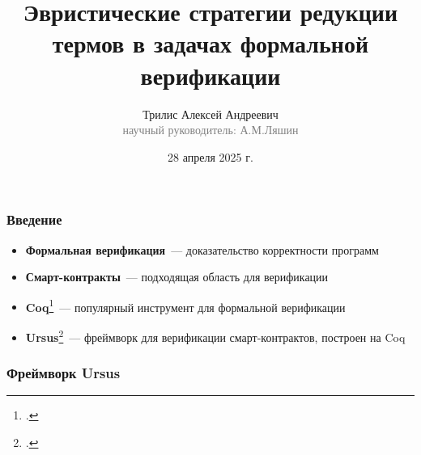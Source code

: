 \documentclass{beamer}
\begin{document}
\title[Стратегии редукции термов в верификации]{Эвристические стратегии редукции термов в задачах формальной верификации}
\author[Трилис А.А.]{Трилис Алексей Андреевич\\{\footnotesize\textcolor{gray}{научный руководитель: А.М.Ляшин}}}
\date{28 апреля 2025 г.}
\frame{\titlepage}

\begin{frame}\frametitle{Введение}
\begin{itemize}
  \item \textbf{Формальная верификация}~--- доказательство корректности программ
  \item \textbf{Смарт-контракты}~--- подходящая область для верификации
  \item \textbf{Coq}\footcite{coq}~--- популярный инструмент для формальной верификации
  \item \textbf{Ursus}\footcite{ursus}~--- фреймворк для верификации смарт-контрактов, построен на Coq
\end{itemize}
\end{frame}


\begin{frame}\frametitle{Фреймворк Ursus}
\end{frame}
\end{document}
